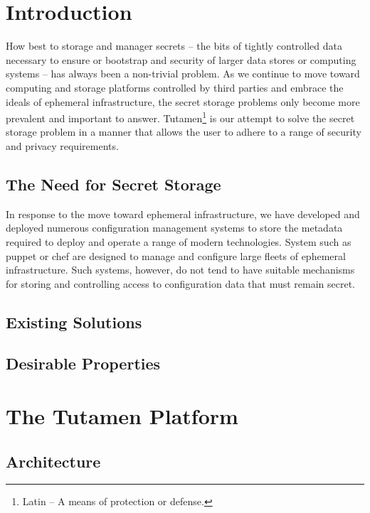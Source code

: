 \documentclass[letterpaper,twocolumn,10pt]{article}
\begin{document}
\section{Introduction}
\label{sec:intro}

How best to storage and manager secrets -- the bits of tightly
controlled data necessary to ensure or bootstrap and security of
larger data stores or computing systems -- has always been a
non-trivial problem. As we continue to move toward computing and
storage platforms controlled by third parties and embrace the ideals
of ephemeral infrastructure, the secret storage problems only become
more prevalent and important to answer. Tutamen\footnote{Latin -- A
  means of protection or defense.} is our attempt to solve the secret
storage problem in a manner that allows the user to adhere to a range
of security and privacy requirements.


\subsection{The Need for Secret Storage}

In response to the move toward ephemeral infrastructure, we have
developed and deployed numerous configuration management systems to
store the metadata required to deploy and operate a range of modern
technologies. System such as puppet\cite{puppet} or chef\cite{chef}
are designed to manage and configure large fleets of ephemeral
infrastructure. Such systems, however, do not tend to have suitable
mechanisms for storing and controlling access to configuration data
that must remain secret.

\subsection{Existing Solutions}

\cite{confidant}
\cite{vault}
\cite{keywhiz}
\cite{openstack-barbican}

\subsection{Desirable Properties}

\section{The Tutamen Platform}
\label{sec:tutamen}

\subsection{Architecture}
\end{document}
